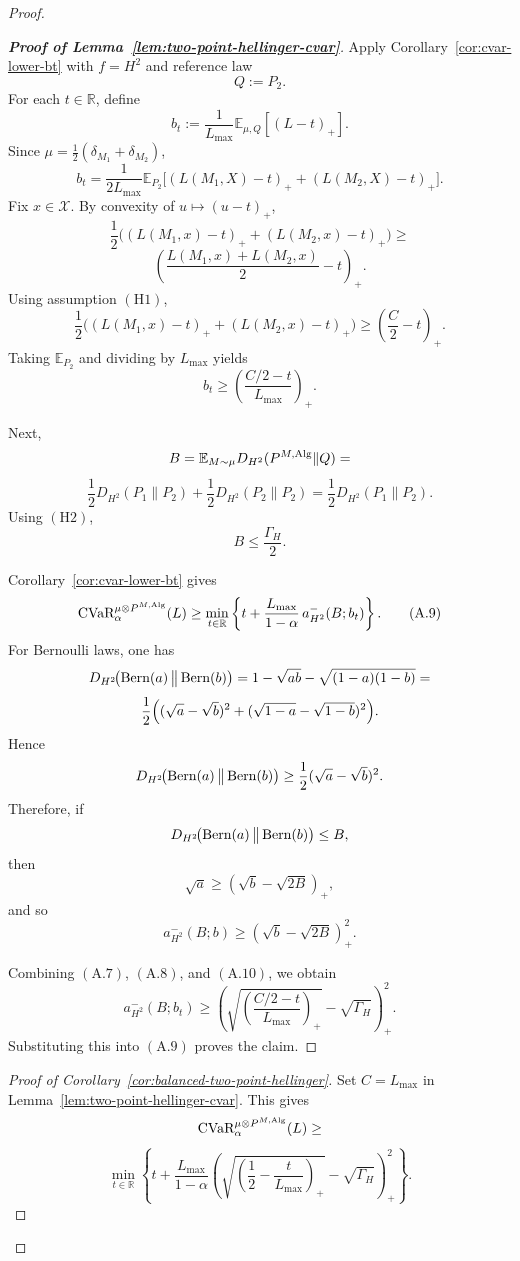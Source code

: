 \documentclass[conference]{IEEEtran}
\begin{document}
\begin{proof}[Proof]
\begin{proof}[\textbf{Proof of Lemma~\ref{lem:two-point-hellinger-cvar}}]
Apply Corollary~\ref{cor:cvar-lower-bt} with \(f=H^2\) and reference law
\[
Q:=P_2.
\]
For each \(t\in\mathbb R\), define
\[
b_t:=\frac{1}{L_{\max}}\mathbb E_{\mu,Q}[(L-t)_+].
\]
Since \(\mu=\frac12(\delta_{M_1}+\delta_{M_2})\),
\[
b_t
=
\frac{1}{2L_{\max}}
\mathbb E_{P_2}\big[(L(M_1,X)-t)_+ + (L(M_2,X)-t)_+\big].
\]
Fix \(x\in\mathcal X\). By convexity of \(u\mapsto (u-t)_+\),
\[
\frac12\Big((L(M_1,x)-t)_+ + (L(M_2,x)-t)_+\Big)
\ge\]
\[
\left(\frac{L(M_1,x)+L(M_2,x)}{2}-t\right)_+.
\]
Using assumption \((\mathrm{H1})\),
\[
\frac12\Big((L(M_1,x)-t)_+ + (L(M_2,x)-t)_+\Big)
\ge
\left(\frac{C}{2}-t\right)_+.
\]
Taking \(\mathbb E_{P_2}\) and dividing by \(L_{\max}\) yields
\[
b_t\ge \left(\frac{C/2-t}{L_{\max}}\right)_+.
\tag{A.7}
\]

Next,
\[
B
=
\mathbb E_{M\sim\mu}D_{H^2}(P^{M,\textup{Alg}}\|Q)
=\]
\[
\frac12D_{H^2}(P_1\|P_2)+\frac12D_{H^2}(P_2\|P_2)
=
\frac12D_{H^2}(P_1\|P_2).
\]
Using \((\mathrm{H2})\),
\[
B\le \frac{\Gamma_H}{2}.
\tag{A.8}
\]

Corollary~\ref{cor:cvar-lower-bt} gives
\[
\textup{CVaR}_\alpha^{\mu\otimes P^{M,\textup{Alg}}}(L)
\ge
\min_{t\in\mathbb R}
\left\{
t+\frac{L_{\max}}{1-\alpha}\,a^-_{H^2}(B;b_t)
\right\}.
\tag{A.9}
\]
For Bernoulli laws, one has
\[
D_{H^2}\!\bigl(\textup{Bern}(a)\,\big\|\,\textup{Bern}(b)\bigr)
=
1-\sqrt{ab}-\sqrt{(1-a)(1-b)}
=\]
\[
\frac12\Bigl((\sqrt a-\sqrt b)^2+(\sqrt{1-a}-\sqrt{1-b})^2\Bigr).
\]
Hence
\[
D_{H^2}\!\bigl(\textup{Bern}(a)\,\big\|\,\textup{Bern}(b)\bigr)
\ge \frac12(\sqrt a-\sqrt b)^2.
\]
Therefore, if
\[
D_{H^2}\!\bigl(\textup{Bern}(a)\,\big\|\,\textup{Bern}(b)\bigr)\le B,
\]
then
\[
\sqrt a\ge (\sqrt b-\sqrt{2B})_+,
\]
and so
\[
a^-_{H^2}(B;b)\ge (\sqrt b-\sqrt{2B})_+^2.
\tag{A.10}
\]

Combining \((\mathrm{A.7})\), \((\mathrm{A.8})\), and \((\mathrm{A.10})\), we obtain
\[
a^-_{H^2}(B;b_t)
\ge
\left(
\sqrt{\left(\frac{C/2-t}{L_{\max}}\right)_+}
-\sqrt{\Gamma_H}
\right)_+^2.
\]
Substituting this into \((\mathrm{A.9})\) proves the claim.
\end{proof}

\begin{proof}[Proof of Corollary~\ref{cor:balanced-two-point-hellinger}]
Set \(C=L_{\max}\) in Lemma~\ref{lem:two-point-hellinger-cvar}. This gives
\[
\textup{CVaR}_\alpha^{\mu\otimes P^{M,\textup{Alg}}}(L)
\ge
\]
\[
\min_{t\in\mathbb R}
\left\{
t+\frac{L_{\max}}{1-\alpha}
\left(
\sqrt{\left(\frac12-\frac{t}{L_{\max}}\right)_+}
-\sqrt{\Gamma_H}
\right)_+^2
\right\}.
\]
\end{proof}


\end{proof}
\end{document}
